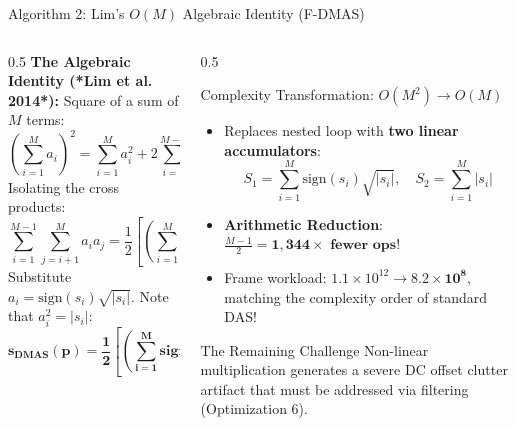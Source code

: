 \documentclass[aspectratio=169,10pt]{beamer}
\begin{document}
\begin{frame}{Algorithm 2: Lim's $O(M)$ Algebraic Identity (F-DMAS)}
  \begin{columns}[T]
    \begin{column}{0.5\textwidth}
      \textbf{\small The Algebraic Identity (*Lim et al. 2014*):}
      \scriptsize
      Square of a sum of $M$ terms:
      $$\left( \sum_{i=1}^M a_i \right)^2 = \sum_{i=1}^M a_i^2 + 2 \sum_{i=1}^{M-1} \sum_{j=i+1}^M a_i a_j$$
      Isolating the cross products:
      $$\sum_{i=1}^{M-1} \sum_{j=i+1}^M a_i a_j = \frac{1}{2} \left[ \left( \sum_{i=1}^M a_i \right)^2 - \sum_{i=1}^M a_i^2 \right]$$
      Substitute $a_i = \text{sign}(s_i)\sqrt{|s_i|}$. Note that $a_i^2 = |s_i|$:
      $$\mathbf{s_{\text{DMAS}}(p) = \frac{1}{2} \left[ \left( \sum_{i=1}^M \text{sign}(s_i) \sqrt{|s_i|} \right)^2 - \sum_{i=1}^M |s_i| \right]}$$
    \end{column}
    \begin{column}{0.5\textwidth}
      \begin{block}{Complexity Transformation: $O(M^2) \to O(M)$}
        \scriptsize
        \begin{itemize}
          \item Replaces nested loop with \textbf{two linear accumulators}:
          $$S_1 = \sum_{i=1}^M \text{sign}(s_i) \sqrt{|s_i|}, \quad S_2 = \sum_{i=1}^M |s_i|$$
          \item \textbf{Arithmetic Reduction}: $\frac{M-1}{2} = \mathbf{1,344\times\text{ fewer ops}}$!
          \item Frame workload: $1.1\times 10^{12} \to \mathbf{8.2\times 10^8}$, matching the complexity order of standard DAS!
        \end{itemize}
      \end{block}
      \begin{alertblock}{The Remaining Challenge}
        \scriptsize
        Non-linear multiplication generates a severe DC offset clutter artifact that must be addressed via filtering (Optimization 6).
      \end{alertblock}
    \end{column}
  \end{columns}
\end{frame}
\end{document}
